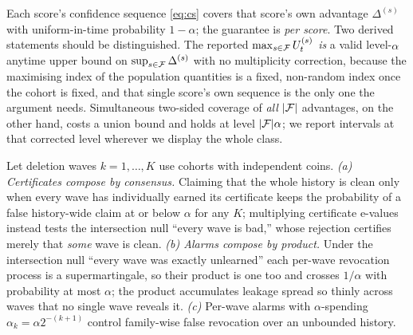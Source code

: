\begin{remark}\label{rem:cs}
Each score's confidence sequence \eqref{eq:cs} covers that score's own advantage
$\Delta^{(s)}$ with uniform-in-time probability $1-\alpha$; the guarantee is
\emph{per score}. Two derived statements should be distinguished. The reported
$\max_{s\in\mathcal{F}} U_t^{(s)}$ \emph{is} a valid level-$\alpha$ anytime upper bound on
$\sup_{s\in\mathcal{F}}\Delta^{(s)}$ with no multiplicity correction, because the maximising
index of the population quantities is a fixed, non-random index once the cohort is
fixed, and that single score's own sequence is the only one the argument needs.
Simultaneous two-sided coverage of \emph{all} $|\mathcal{F}|$ advantages, on the other hand,
costs a union bound and holds at level $|\mathcal{F}|\alpha$; we report intervals at that
corrected level wherever we display the whole class.
\end{remark}

\begin{theorem}\label{thm:streaming}
Let deletion waves $k = 1,\dots,K$ use cohorts with independent coins.
\emph{(a) Certificates compose by consensus.} Claiming that the whole history is clean
only when every wave has individually earned its certificate keeps the probability of a
false history-wide claim at or below $\alpha$ for any $K$; multiplying certificate
e-values instead tests the intersection null ``every wave is bad,'' whose rejection
certifies merely that \emph{some} wave is clean.
\emph{(b) Alarms compose by product.} Under the intersection null ``every wave was
exactly unlearned'' each per-wave revocation process is a supermartingale, so their
product is one too and crosses $1/\alpha$ with probability at most $\alpha$; the product
accumulates leakage spread so thinly across waves that no single wave reveals it.
\emph{(c)} Per-wave alarms with $\alpha$-spending $\alpha_k = \alpha 2^{-(k+1)}$ control
family-wise false revocation over an unbounded history.
\end{theorem}


